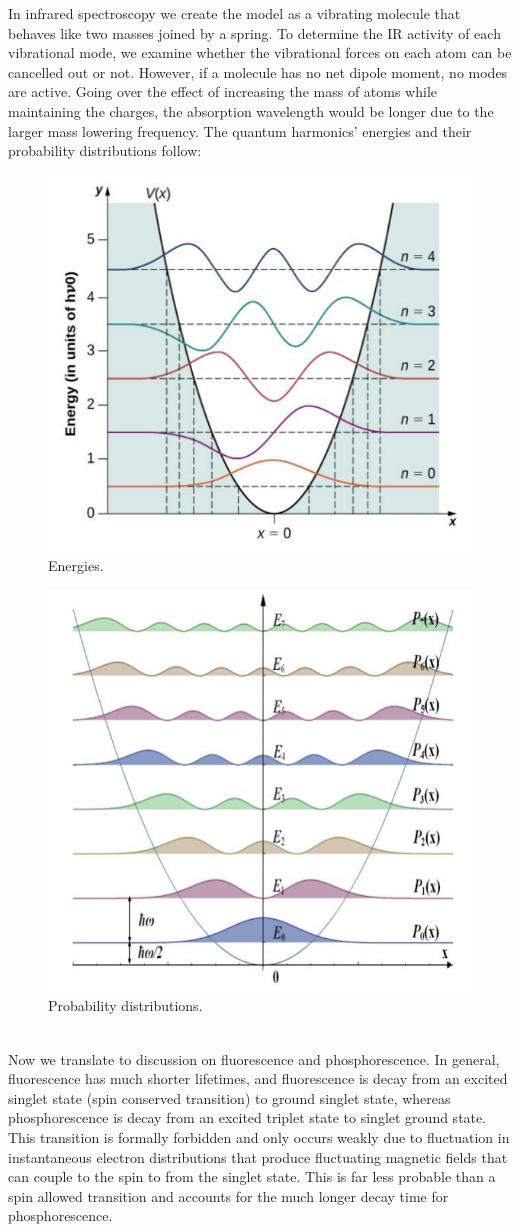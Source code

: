 \documentclass[11pt,fleqn]{book}
\begin{document}
In infrared spectroscopy we create the model as a vibrating molecule that behaves like two masses joined by a spring. To determine the IR activity of each vibrational mode, we examine whether the vibrational forces on each atom can be cancelled out or not. However, if a molecule has no net dipole moment, no modes are active. Going over the effect of increasing the mass of atoms while maintaining the charges, the absorption wavelength would be longer due to the larger mass lowering frequency. The quantum harmonics' energies and their probability distributions follow:
\newpage
\begin{figure}[h!]
	\begin{center}
		\includegraphics[width=0.37\linewidth]{Pictures/energy.png}
	\end{center}
	\caption{Energies.
	}
\end{figure}

\begin{figure}[h!]
\begin{center}
	\includegraphics[width=0.4\linewidth]{Pictures/prob.png}
\end{center}
\caption{Probability distributions.
}
\end{figure}
\\

Now we translate to discussion on fluorescence and phosphorescence. In general, fluorescence has much shorter lifetimes, and fluorescence is decay from an excited singlet state (spin conserved transition) to ground singlet state, whereas phosphorescence is decay from an excited triplet state to singlet ground state. This transition is formally forbidden and only occurs weakly due to fluctuation in instantaneous electron distributions that produce fluctuating
magnetic fields that can couple to the spin to from the singlet state. This is far less probable than
a spin allowed transition and accounts for the much longer decay time for phosphorescence. 
\end{document}
